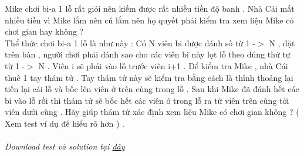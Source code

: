 Mike chơi bi-a 1 lỗ rất giỏi nên kiếm được rất nhiều tiền độ banh . Nhà Cái mất nhiều tiền vì Mike lắm nên cú lắm nên họ quyết phải kiểm tra xem liệu Mike có chơi gian hay không ?   
\\   Thể thức chơi bi-a 1 lỗ là như này : Có N viên bi được đánh số từ 1 -$>$ N , đặt trên bàn , người chơi phải đánh sao cho các viên bi này lọt lỗ theo đúng thứ tự từ 1 -$>$ N . Viên i sẽ phải vào lỗ trước viên i+1 . Để kiểm tra Mike , nhà Cái thuê 1 tay thám tử . Tay thám tử này sẽ kiểm tra bằng cách là thỉnh thoảng lại tiến lại cái lỗ và bốc lên viên ở trên cùng trong lỗ . Sau khi Mike đã đánh hết các bi vào lỗ rồi thì thám tử sẽ bốc hết các viên ở trong lỗ ra từ viên trên cùng tới viên dưới cùng . Hãy giúp thám tử xác định xem liệu Mike có chơi gian không ? ( Xem test ví dụ để hiểu rõ hơn ) .   
\\
\\\textit{    Download test và solution tại    \href{https://vn.spoj.pl/content/cheat.zip}{     đây    }}